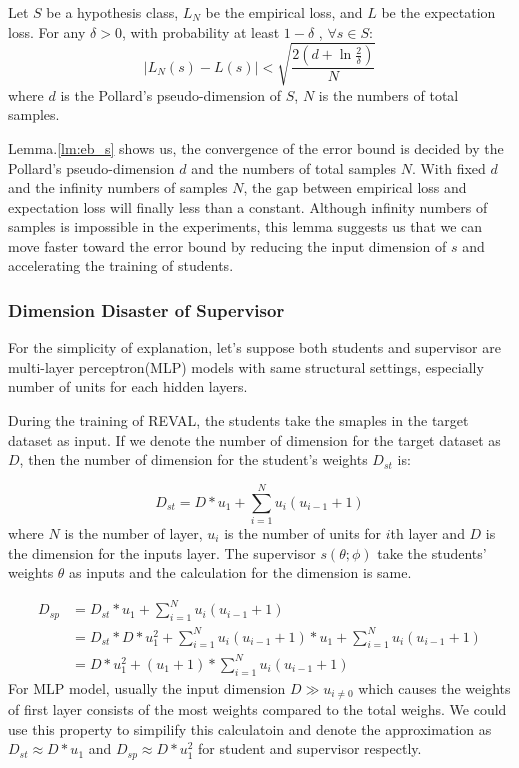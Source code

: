 \documentclass[english]{sobraep}
\begin{document}
\begin{lemma} \label{lm:eb_s}
Let $S$ be a hypothesis class, $L_N$ be the empirical loss, and $L$ be the expectation loss. For any $\delta > 0$, with probability at least $1-\delta$ , $\forall s \in S:$
\begin{equation*}
    |L_N(s)-L(s)| < \sqrt{\frac{2(d + \ln{\frac{2}{\delta}})}{N}}
\end{equation*}
where $d$ is the Pollard’s pseudo-dimension of $S$, $N$ is the numbers of total samples.
\end{lemma}

Lemma.\ref{lm:eb_s} shows us, the convergence of the error bound is decided by the Pollard’s pseudo-dimension $d$ and the numbers of total samples $N$. With fixed $d$ and the infinity numbers of samples $N$, the gap between empirical loss and expectation loss will finally less than a constant. Although infinity numbers of samples is impossible in the experiments, this lemma suggests us that we can move faster toward the error bound by reducing the input dimension of $s$ and accelerating the training of students. 

\subsubsection{Dimension Disaster of Supervisor} 

For the simplicity of explanation, let's suppose both students and supervisor are multi-layer perceptron(MLP) models with same structural settings, especially number of units for each hidden layers. 

During the training of REVAL, the students take the smaples in the target dataset as input. If we denote the number of dimension for the target dataset as $D$, then the number of dimension for the student's weights $D_{st}$ is:

\begin{equation*}
    D_{st} = D*u_1 + \sum_{i=1}^{N} u_i(u_{i-1}+1)
\end{equation*}
where $N$ is the number of layer, $u_i$ is the number of units for $i$th layer and $D$ is the dimension for the inputs layer.
The supervisor $s(\theta;\phi)$ take the students' weights $\theta$ as inputs and the calculation for the dimension is same.

\begin{equation*}
\begin{aligned}
    D_{sp}&= D_{st}*u_1 + \sum_{i=1}^{N} u_i(u_{i-1}+1) \\
          &= D_{st}*D*u^2_1 + \sum_{i=1}^{N} u_i(u_{i-1}+1)*u_1 +\sum_{i=1}^{N} u_i(u_{i-1}+1) \\
          &= D*u^2_1 + (u_1+1)*\sum_{i=1}^{N} u_i(u_{i-1}+1)
\end{aligned}
\end{equation*}
For MLP model, usually the input dimension $D \gg u_{i \neq 0}$ which causes the weights of first layer consists of the most weights compared to the total weighs. We could use this property to simpilify this calculatoin and denote the approximation as $D_{st} \approx  D*u_{1}$ and $D_{sp} \approx  D*u_{1}^2$ for student and supervisor respectly.
\end{document}
